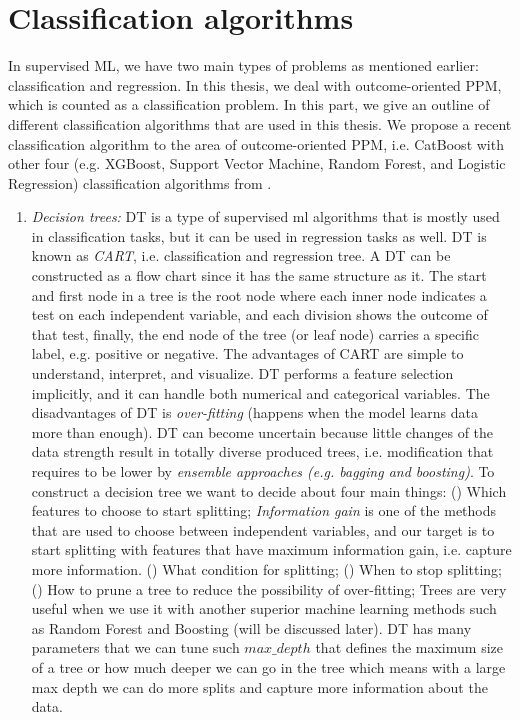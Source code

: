 \section{Classification algorithms}

In supervised ML, we have two main types of problems as mentioned earlier: classification and regression. In this thesis, we deal with outcome-oriented PPM, which is counted as a classification problem. In this part, we give an outline of different classification algorithms that are used in this thesis. We propose a recent classification algorithm to the area of outcome-oriented PPM, i.e. CatBoost with other four (e.g. XGBoost, Support Vector Machine, Random Forest, and Logistic Regression) classification algorithms from \cite{teinemaa2019outcome}.

\begin{enumerate}
	\item \textit{Decision trees:} DT is a type of supervised ml algorithms that is mostly used in classification tasks, but it can be used in regression tasks as well. DT is known as \textit{CART}, i.e. classification and regression tree.  A DT can be constructed as a flow chart since it has the same structure as it. The start and first node in a tree is the root node where each inner node indicates a test on each independent variable, and each division shows the outcome of that test, finally, the end node of the tree (or leaf node) carries a specific label, e.g. positive or negative. The advantages of CART are simple to understand, interpret, and visualize. DT performs a feature selection implicitly, and it can handle both numerical and categorical variables. The disadvantages of DT is \textit{over-fitting} (happens when the model learns data more than enough). DT can become uncertain because little changes of the data strength result in totally diverse produced trees, i.e. modification that requires to be lower by \textit{ensemble approaches (e.g. bagging and boosting)}. To construct a decision tree we want to decide about four main things: () Which features to choose to start splitting; \textit{Information gain} is one of the methods that are used to choose between independent variables, and our target is to start splitting with features that have maximum information gain, i.e. capture more information. () What condition for splitting; () When to stop splitting; () How to prune a tree to reduce the possibility of over-fitting; Trees are very useful when we use it with another superior machine learning methods such as Random Forest and Boosting (will be discussed later). DT has many parameters that we can tune such $max\_depth$ that defines the maximum size of a tree or how much deeper we can go in the tree which means with a large max depth we can do more splits and capture more information about the data. 
	

\end{enumerate}
